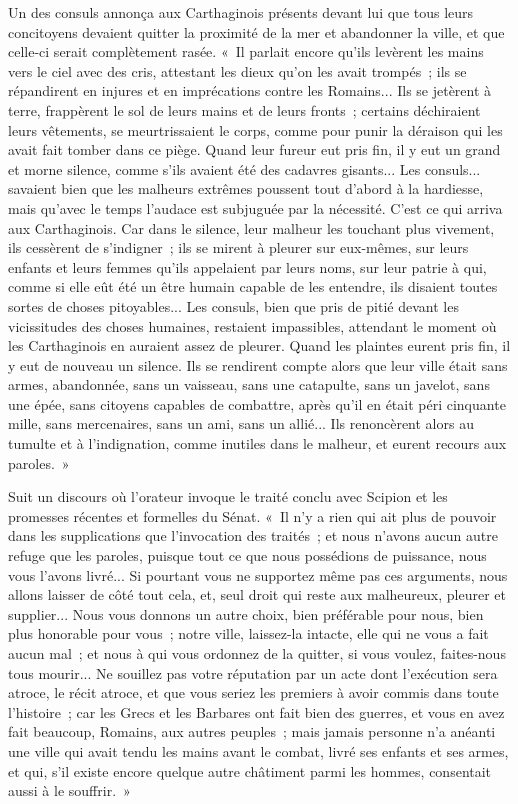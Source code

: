 \documentclass[french,twoside]{book} %
\begin{document}
Un des consuls annonça aux Carthaginois présents devant lui que tous leurs concitoyens devaient quitter la proximité de la mer et abandonner la ville, et que celle-ci serait complètement rasée. « Il parlait encore qu'ils levè­rent les mains vers le ciel avec des cris, attestant les dieux qu'on les avait trompés ; ils se répandirent en injures et en imprécations contre les Romains... Ils se jetèrent à terre, frappèrent le sol de leurs mains et de leurs fronts ; certains déchiraient leurs vêtements, se meurtrissaient le corps, comme pour punir la déraison qui les avait fait tomber dans ce piège. Quand leur fureur eut pris fin, il y eut un grand et morne silence, comme s'ils avaient été des cada­vres gisants... Les consuls... savaient bien que les malheurs extrêmes poussent tout d'abord à la hardiesse, mais qu'avec le temps l'audace est subjuguée par la nécessité. C'est ce qui arriva aux Carthaginois. Car dans le silence, leur mal­heur les touchant plus vivement, ils cessèrent de s'indigner ; ils se mirent à pleurer sur eux-mêmes, sur leurs enfants et leurs femmes qu'ils appelaient par leurs noms, sur leur patrie à qui, comme si elle eût été un être humain capable de les entendre, ils disaient toutes sortes de choses pitoyables... Les consuls, bien que pris de pitié devant les vicissitudes des choses humaines, restaient impassibles, attendant le moment où les Carthaginois en auraient assez de pleurer. Quand les plaintes eurent pris fin, il y eut de nouveau un silence. Ils se rendirent compte alors que leur ville était sans armes, abandonnée, sans un vaisseau, sans une catapulte, sans un javelot, sans une épée, sans citoyens capables de combattre, après qu'il en était péri cinquante mille, sans merce­naires, sans un ami, sans un allié... Ils renoncèrent alors au tumulte et à l'indignation, comme inutiles dans le malheur, et eurent recours aux paroles. »\par
Suit un discours où l'orateur invoque le traité conclu avec Scipion et les promesses récentes et formelles du Sénat. « Il n'y a rien qui ait plus de pouvoir dans les supplications que l'invocation des traités ; et nous n'avons aucun autre refuge que les paroles, puisque tout ce que nous possédions de puissance, nous vous l'avons livré... Si pourtant vous ne supportez même pas ces arguments, nous allons laisser de côté tout cela, et, seul droit qui reste aux malheureux, pleurer et supplier... Nous vous donnons un autre choix, bien préférable pour nous, bien plus honorable pour vous ; notre ville, laissez-la intacte, elle qui ne vous a fait aucun mal ; et nous à qui vous ordonnez de la quitter, si vous voulez, faites-nous tous mourir... Ne souillez pas votre réputation par un acte dont l'exécution sera atroce, le récit atroce, et que vous seriez les premiers à avoir commis dans toute l'histoire ; car les Grecs et les Barbares ont fait bien des guerres, et vous en avez fait beaucoup, Romains, aux autres peuples ; mais jamais personne n'a anéanti une ville qui avait tendu les mains avant le combat, livré ses enfants et ses armes, et qui, s'il existe encore quelque autre châtiment parmi les hommes, consentait aussi à le souffrir. »\par
\end{document}
